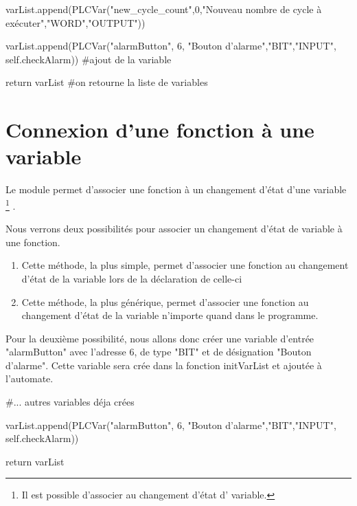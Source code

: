 {\begin{Python}
    	varList.append(PLCVar("new_cycle_count",0,"Nouveau nombre de cycle à exécuter","WORD","OUTPUT"))

        varList.append(PLCVar("alarmButton", 6, "Bouton d'alarme","BIT","INPUT", self.checkAlarm)) #ajout de la variable

	    return varList  #on retourne la liste de variables

\end{Python}



\section{Connexion d'une fonction à une variable}

Le module  permet d'associer une fonction à un changement d'état d'une variable
\footnote{Il est possible d'associer  au changement d'état d' variable.}
.\newline

Nous verrons deux possibilités pour associer un changement d'état de variable à une fonction.\newline
\begin{enumerate}
    \item {}\newline Cette méthode, la plus simple, permet d'associer une fonction au changement d'état de la variable lors de la déclaration de celle-ci
    
    \item {}\newline Cette méthode, la plus générique, permet d'associer une fonction au changement d'état de la variable n'importe quand dans le programme.
\end{enumerate}


Pour la deuxième possibilité, nous allons donc créer une variable d'entrée "alarmButton" avec l'adresse 6, de type "BIT" et de désignation "Bouton d'alarme". \newline Cette variable sera crée dans la fonction initVarList et ajoutée à l'automate. \newline
\begin{Python}
    #... autres variables déja crées
    
    varList.append(PLCVar("alarmButton", 6, "Bouton d'alarme","BIT","INPUT", self.checkAlarm))
    
    return varList
\end{Python}

}
